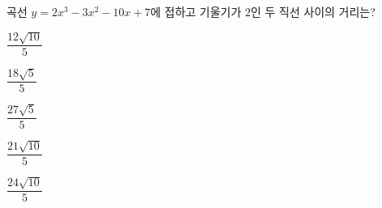 곡선 $y=2x^3-3x^2-10x+7$에 접하고 기울기가 $2$인 두 직선 사이의 거리는?
\begin{choices32}{\rule[-3ex]{0pt}{8ex}$\dfrac{12\sqrt{10}}{5}$}{\rule[-3ex]{0pt}{8ex}$\dfrac{18\sqrt{5}}{5}$}{\rule[-3ex]{0pt}{8ex}$\dfrac{27\sqrt{5}}{5}$}{\rule[-3ex]{0pt}{8ex}$\dfrac{21\sqrt{10}}{5}$}{\rule[-3ex]{0pt}{8ex}$\dfrac{24\sqrt{10}}{5}$}\end{choices32}
